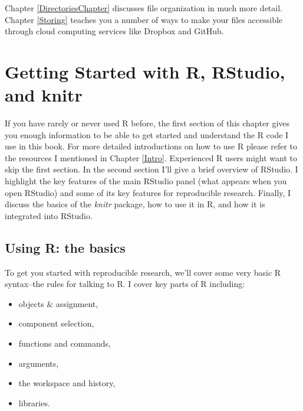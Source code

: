 \documentclass[krantz1]{krantz}
\begin{document}
Chapter \ref{DirectoriesChapter} discusses file organization in much more detail. Chapter \ref{Storing} teaches you a number of ways to make your files accessible through cloud computing services like Dropbox and GitHub.






\chapter{Getting Started with R, RStudio, and knitr}\label{GettingStartedRKnitr}

If you have rarely or never used R before, the first section of this chapter gives you enough information to be able to get started and understand the R code I use in this book. For more detailed introductions on how to use R please refer to the resources I mentioned in Chapter \ref{Intro}. Experienced R users might want to skip the first section. In the second section I'll give a brief overview of RStudio. I highlight the key features of the main RStudio panel (what appears when you open RStudio) and some of its key features for reproducible research. Finally, I discuss the basics of the {\emph{knitr}} package, how to use it in R, and how it is integrated into RStudio.

\section{Using R: the basics}

To get you started with reproducible research, we'll cover some very basic R syntax--the rules for talking to R. I cover key parts of R including:

\begin{itemize}
    \item objects \& assignment,
    \item component selection,
    \item functions and commands,
    \item arguments,
    \item the workspace and history,
    \item libraries.
\end{itemize}
\end{document}
